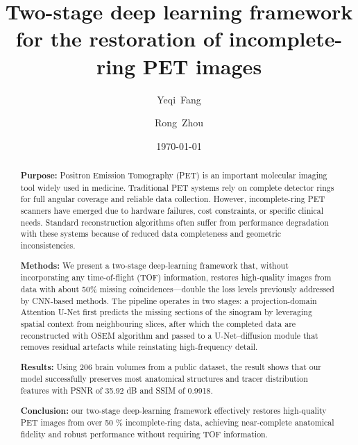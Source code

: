 \documentclass[aps,prb,preprint,groupedaddress,showkeys]{revtex4}
\begin{document}
\def\papertitle{Two-stage deep learning framework for the restoration of incomplete-ring PET images}
\title{\papertitle}

\author{Yeqi~Fang}
\author{Rong~Zhou}

\date{\today}

\begin{abstract}
\textbf{Purpose:} Positron Emission Tomography (PET) is an important molecular imaging tool widely used in medicine. Traditional PET systems rely on complete detector rings for full angular coverage and reliable data collection. However, incomplete-ring PET scanners have emerged due to hardware failures, cost constraints, or specific clinical needs. Standard reconstruction algorithms often suffer from performance degradation with these systems because of reduced data completeness and geometric inconsistencies.

\textbf{Methods:} We present a two-stage deep-learning framework that, without incorporating any time-of-flight (TOF) information, restores high-quality images from data with about 50\% missing coincidences—double the loss levels previously addressed by CNN-based methods. The pipeline operates in two stages: a projection-domain Attention U-Net first predicts the missing sections of the sinogram by leveraging spatial context from neighbouring slices, after which the completed data are reconstructed with OSEM algorithm and passed to a U-Net–diffusion module that removes residual artefacts while reinstating high-frequency detail.

\textbf{Results:} Using 206 brain volumes from a public dataset, the result shows that our model successfully preserves most anatomical structures and tracer distribution features with PSNR of 35.92 dB and SSIM of 0.9918.

\textbf{Conclusion:} our two-stage deep‐learning framework effectively restores high‐quality PET images from over 50 \% incomplete‐ring data, achieving near‐complete anatomical fidelity and robust performance without requiring TOF information.
\end{abstract}

\maketitle
\end{document}
